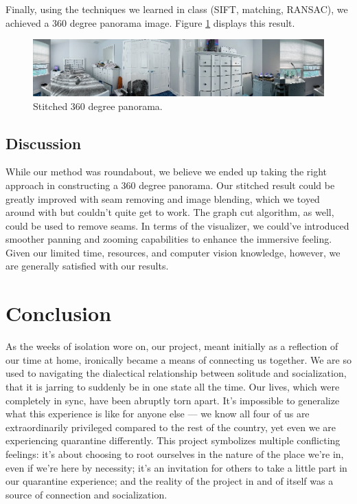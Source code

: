 \documentclass[10pt,twocolumn,letterpaper]{article}
\begin{document}
Finally, using the techniques we learned in class (SIFT, matching, RANSAC), we achieved a 360 degree panorama image. Figure \ref{fig:result3} displays this result.
\begin{figure}[h]
\centering
 \includegraphics[width=\linewidth]{pano5.jpg}
\caption{Stitched 360 degree panorama. }
\label{fig:result3}
\end{figure}

\subsection{Discussion}

While our method was roundabout, we believe we ended up taking the right approach in constructing a 360 degree panorama. Our stitched result could be greatly improved with seam removing and image blending, which we toyed around with but couldn't quite get to work. The graph cut algorithm, as well, could be used to remove seams. In terms of the visualizer, we could've introduced smoother panning and zooming capabilities to enhance the immersive feeling. Given our limited time, resources, and computer vision knowledge, however, we are generally satisfied with our results.

\section{Conclusion}

As the weeks of isolation wore on, our project, meant initially as a reflection of our time at home, ironically became a means of connecting us together. We are so used to navigating the dialectical relationship between solitude and socialization, that it is jarring to suddenly be in one state all the time. Our lives, which were completely in sync, have been abruptly torn apart. It's impossible to generalize what this experience is like for anyone else — we know all four of us are extraordinarily privileged compared to the rest of the country, yet even we are experiencing quarantine differently. This project symbolizes multiple conflicting feelings: it's about choosing to root ourselves in the nature of the place we're in, even if we're here by necessity; it's an invitation for others to take a little part in our quarantine experience; and the reality of the project in and of itself was a source of connection and socialization.
\end{document}
